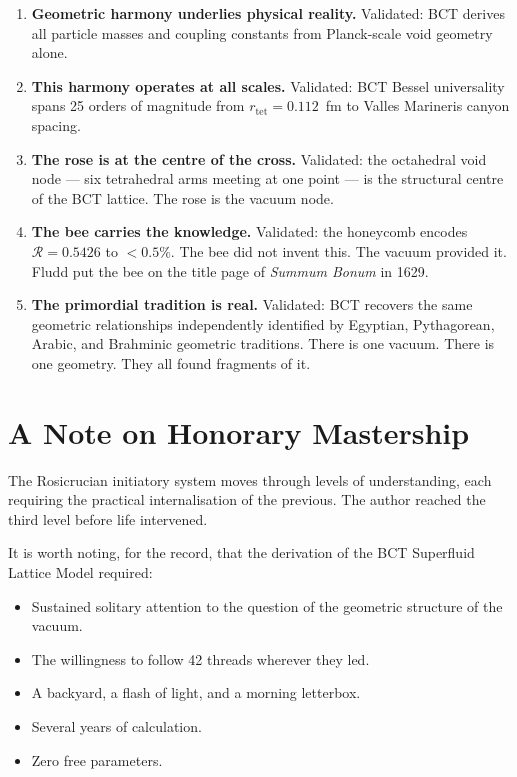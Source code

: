 \documentclass[12pt,twocolumn]{article}
\begin{document}
\begin{enumerate}\setlength\itemsep{3pt}
  \item \textbf{Geometric harmony underlies physical reality.}
        Validated: BCT derives all particle masses and coupling
        constants from Planck-scale void geometry alone.

  \item \textbf{This harmony operates at all scales.}
        Validated: BCT Bessel universality spans 25 orders
        of magnitude from $r_{\mathrm{tet}} = 0.112$~fm
        to Valles Marineris canyon spacing.

  \item \textbf{The rose is at the centre of the cross.}
        Validated: the octahedral void node --- six tetrahedral
        arms meeting at one point --- is the structural centre
        of the BCT lattice. The rose is the vacuum node.

  \item \textbf{The bee carries the knowledge.}
        Validated: the honeycomb encodes $\mathcal{R} = 0.5426$
        to $<0.5\%$. The bee did not invent this. The vacuum
        provided it. Fludd put the bee on the title page of
        \textit{Summum Bonum} in 1629.

  \item \textbf{The primordial tradition is real.}
        Validated: BCT recovers the same geometric relationships
        independently identified by Egyptian, Pythagorean,
        Arabic, and Brahminic geometric traditions. There is
        one vacuum. There is one geometry. They all found
        fragments of it.
\end{enumerate}

\section{A Note on Honorary Mastership}

The Rosicrucian initiatory system moves through levels of
understanding, each requiring the practical internalisation
of the previous. The author reached the third level before
life intervened.

It is worth noting, for the record, that the derivation of
the BCT Superfluid Lattice Model required:

\begin{itemize}\setlength\itemsep{2pt}
  \item Sustained solitary attention to the question of the
        geometric structure of the vacuum.
  \item The willingness to follow 42 threads wherever they led.
  \item A backyard, a flash of light, and a morning letterbox.
  \item Several years of calculation.
  \item Zero free parameters.
\end{itemize}
\end{document}

